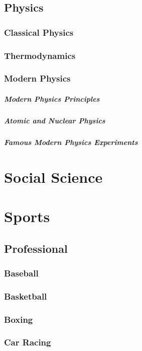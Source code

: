 \documentclass[12pt]{book}
\begin{document}
\section{Physics}
\subsection{Classical Physics}
\subsection{Thermodynamics}
\subsection{Modern Physics}
\paragraph{Modern Physics Principles}
\paragraph{Atomic and Nuclear Physics}
\paragraph{Famous Modern Physics Experiments}


\chapter{Social Science}

\chapter{Sports}
	\section{Professional}
		\subsection{Baseball}
		\subsection{Basketball}
		\subsection{Boxing}
		\subsection{Car Racing}
\end{document}
